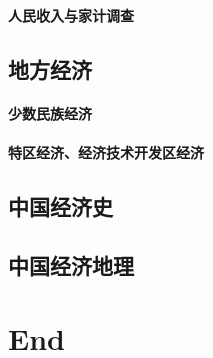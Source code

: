 \documentclass[UTF8]{../../RepresentationUniverse}
\begin{document}
    \subsubsection{人民收入与家计调查}
\section{地方经济}
    \subsubsection{少数民族经济}
    \subsubsection{特区经济、经济技术开发区经济}
\section{中国经济史}
\section{中国经济地理}




\chapter{End}
\end{document}
